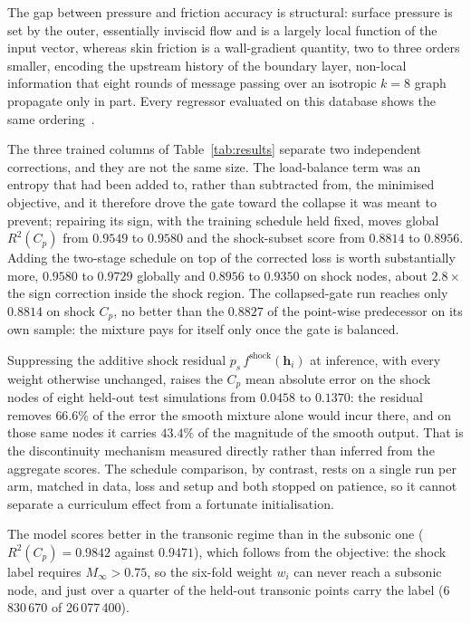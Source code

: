 \documentclass{WCCM-ECCOMAS_2026_Full_Paper}
\begin{document}
The gap between pressure and friction accuracy is structural: surface
pressure is set by the outer, essentially inviscid flow and is a
largely local function of the input vector, whereas skin friction is a
wall-gradient quantity, two to three orders smaller, encoding the
upstream history of the boundary layer, non-local information that
eight rounds of message passing over an isotropic $k{=}8$ graph
propagate only in part.  Every regressor evaluated on this database
shows the same ordering~\cite{Peter2025}.

The three trained columns of Table~\ref{tab:results} separate two
independent corrections, and they are not the same size.  The
load-balance term was an entropy that had been added to, rather than
subtracted from, the minimised objective, and it therefore drove the
gate toward the collapse it was meant to prevent; repairing its sign,
with the training schedule held fixed, moves global $R^{2}(C_p)$ from
$0.9549$ to $0.9580$ and the shock-subset score from $0.8814$ to
$0.8956$.  Adding the two-stage schedule on top of the corrected loss
is worth substantially more, $0.9580$ to $0.9729$ globally and
$0.8956$ to $0.9350$ on shock nodes, about $2.8\times$ the sign
correction inside the shock region.  The collapsed-gate run reaches
only $0.8814$ on shock $C_p$, no better than the $0.8827$ of the
point-wise predecessor on its own sample: the mixture pays for itself
only once the gate is balanced.

Suppressing the additive shock residual $p_s\,f^{\mathrm{shock}}(\mathbf{h}_i)$
at inference, with every weight otherwise unchanged, raises the $C_p$ mean
absolute error on the shock nodes of eight held-out test simulations from
$0.0458$ to $0.1370$: the residual removes $66.6\%$ of the error the smooth
mixture alone would incur there, and on those same nodes it carries $43.4\%$
of the magnitude of the smooth output.  That is the discontinuity mechanism
measured directly rather than inferred from the aggregate scores.  The schedule
comparison, by contrast, rests on a single run per arm, matched in data,
loss and setup and both stopped on patience, so it cannot separate a
curriculum effect from a fortunate initialisation.

The model scores better in the transonic regime than in the subsonic
one ($R^{2}(C_p) = 0.9842$ against $0.9471$), which follows from the
objective: the shock label requires $M_{\infty} > 0.75$, so the
six-fold weight $w_i$ can never reach a subsonic node, and just over a
quarter of the held-out transonic points carry the label
(6\,830\,670 of 26\,077\,400).
\end{document}
